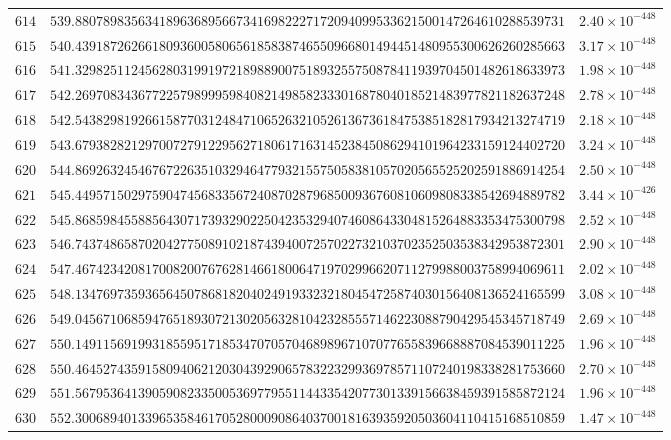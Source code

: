 \documentclass[12pt,reqno]{amsart}
\theoremstyle{remark}
\begin{document}
\begin{longtable}{clc}
$614$ & $539.8807898356341896368956673416982227172094099533621500147264610288539731$ & $2.40\times 10^{-448}$ \\
$615$ & $540.4391872626618093600580656185838746550966801494451480955300626260285663$ & $3.17\times 10^{-448}$ \\
$616$ & $541.3298251124562803199197218988900751893255750878411939704501482618633973$ & $1.98\times 10^{-448}$ \\
$617$ & $542.2697083436772257989995984082149858233301687804018521483977821182637248$ & $2.78\times 10^{-448}$ \\
$618$ & $542.5438298192661587703124847106526321052613673618475385182817934213274719$ & $2.18\times 10^{-448}$ \\
$619$ & $543.6793828212970072791229562718061716314523845086294101964233159124402720$ & $3.24\times 10^{-448}$ \\
$620$ & $544.8692632454676722635103294647793215575058381057020565525202591886914254$ & $2.50\times 10^{-448}$ \\
$621$ & $545.4495715029759047456833567240870287968500936760810609808338542694889782$ & $3.44\times 10^{-426}$ \\
$622$ & $545.8685984558856430717393290225042353294074608643304815264883353475300798$ & $2.52\times 10^{-448}$ \\
$623$ & $546.7437486587020427750891021874394007257022732103702352503538342953872301$ & $2.90\times 10^{-448}$ \\
$624$ & $547.4674234208170082007676281466180064719702996620711279988003758994069611$ & $2.02\times 10^{-448}$ \\
$625$ & $548.1347697359365645078681820402491933232180454725874030156408136524165599$ & $3.08\times 10^{-448}$ \\
$626$ & $549.0456710685947651893072130205632810423285557146223088790429545345718749$ & $2.69\times 10^{-448}$ \\
$627$ & $550.1491156919931855951718534707057046898967107077655839668887084539011225$ & $1.96\times 10^{-448}$ \\
$628$ & $550.4645274359158094062120304392906578322329936978571107240198338281753660$ & $2.70\times 10^{-448}$ \\
$629$ & $551.5679536413905908233500536977955114433542077301339156638459391585872124$ & $1.96\times 10^{-448}$ \\
$630$ & $552.3006894013396535846170528000908640370018163935920503604110415168510859$ & $1.47\times 10^{-448}$ \\

\end{longtable}
\end{document}
